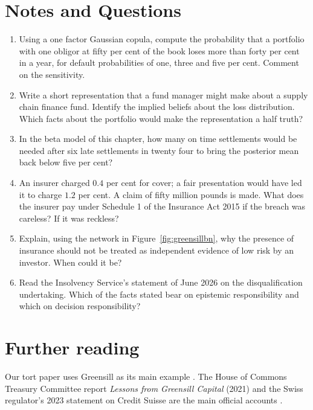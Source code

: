 \section*{Notes and Questions}
\begin{enumerate}[label=\arabic*.]
\item Using a one factor Gaussian copula, compute the probability that a portfolio with one obligor at fifty per cent of the book loses more than forty per cent in a year, for default probabilities of one, three and five per cent. Comment on the sensitivity.
\item Write a short representation that a fund manager might make about a supply chain finance fund. Identify the implied beliefs about the loss distribution. Which facts about the portfolio would make the representation a half truth?
\item In the beta model of this chapter, how many on time settlements would be needed after six late settlements in twenty four to bring the posterior mean back below five per cent?
\item An insurer charged $0.4$ per cent for cover; a fair presentation would have led it to charge $1.2$ per cent. A claim of fifty million pounds is made. What does the insurer pay under Schedule 1 of the Insurance Act 2015 if the breach was careless? If it was reckless?
\item Explain, using the network in Figure~\ref{fig:greensillbn}, why the presence of insurance should not be treated as independent evidence of low risk by an investor. When could it be?
\item Read the Insolvency Service's statement of June 2026 on the disqualification undertaking. Which of the facts stated bear on epistemic responsibility and which on decision responsibility?
\end{enumerate}

\section*{Further reading}
Our tort paper uses Greensill as its main example \citep{polson_sokolov_tort}. The House of Commons Treasury Committee report \emph{Lessons from Greensill Capital} (2021) and the Swiss regulator's 2023 statement on Credit Suisse are the main official accounts \citep{treasury2021,finma2023}.
